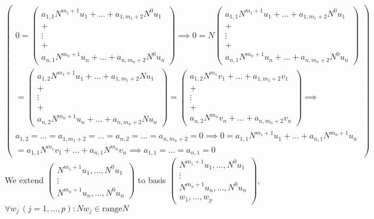 \documentclass{article}
\newcommand{\0}{{\bf{0}}}
\begin{document}
$$\begin{pmatrix}
    0=\begin{pmatrix}
        a_{1,1}N^{m_1+1}u_1+\dots+a_{1,m_1+2}N^0u_1\\
        +\\
        \vdots\\
        +\\
        a_{n,1}N^{m_n+1}u_n+\dots+a_{n,m_n+2}N^0u_n
    \end{pmatrix}\implies0=N\begin{pmatrix}
        a_{1,1}N^{m_1+1}u_1+\dots+a_{1,m_1+2}N^0u_1\\
        +\\
        \vdots\\
        +\\
        a_{n,1}N^{m_n+1}u_n+\dots+a_{n,m_n+2}N^0u_n
    \end{pmatrix}\\
    =\begin{pmatrix}
        a_{1,2}N^{m_1+1}u_1+\dots+a_{1,m_1+2}Nu_1\\
        +\\
        \vdots\\
        +\\
        a_{n,2}N^{m_n+1}u_n+\dots+a_{n,m_n+2}Nu_n
    \end{pmatrix}=\begin{pmatrix}
        a_{1,2}N^{m_1}v_1+\dots+a_{1,m_1+2}v_1\\
        +\\
        \vdots\\
        +\\
        a_{n,2}N^{m_n}v_n+\dots+a_{n,m_n+2}v_n
    \end{pmatrix}\implies\\
    a_{1,2}=\dots=a_{1,m_1+2}=\dots=a_{n,2}=\dots=a_{n,m_n+2}=0\implies0=a_{1,1}N^{m_1+1}u_1+\dots+a_{n,1}N^{m_n+1}u_n\\
    =a_{1,1}N^{m_1}v_1+\dots+a_{n,1}N^{m_n}v_n\implies a_{1,1}=\dots=a_{n,1}=0
\end{pmatrix}$$
We extend $\begin{pmatrix}
    N^{m_1+1}u_1,\dots,N^0u_1\\
    \vdots\\
    N^{m_n+1}u_n,\dots,N^0u_n
\end{pmatrix}$ to basis $\begin{pmatrix}
    N^{m_1+1}u_1,\dots,N^0u_1\\
    \vdots\\
    N^{m_n+1}u_n,\dots,N^0u_n\\
    w_1,\dots,w_p
\end{pmatrix}$, $\forall w_j\,(j=1,\dots,p):Nw_j\in\mbox{range}N$
\end{document}
